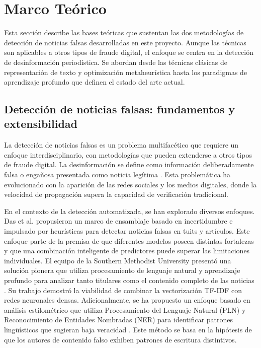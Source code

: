 \chapter{Marco Teórico \label{cap:MarcoTeorico}}

Esta sección describe las bases teóricas que sustentan las dos metodologías de detección de noticias falsas desarrolladas en este proyecto. Aunque las técnicas son aplicables a otros tipos de fraude digital, el enfoque se centra en la detección de desinformación periodística. Se abordan desde las técnicas clásicas de representación de texto y optimización metaheurística hasta los paradigmas de aprendizaje profundo que definen el estado del arte actual.

\section{Detección de noticias falsas: fundamentos y extensibilidad}
\label{sec:deteccion_noticias_falsas}

La detección de noticias falsas es un problema multifacético que requiere un enfoque interdisciplinario, con metodologías que pueden extenderse a otros tipos de fraude digital. La desinformación se define como información deliberadamente falsa o engañosa presentada como noticia legítima \cite{bondielli2019survey}. Esta problemática ha evolucionado con la aparición de las redes sociales y los medios digitales, donde la velocidad de propagación supera la capacidad de verificación tradicional.

En el contexto de la detección automatizada, se han explorado diversos enfoques. Das et al. \cite{das2022heuristic} propusieron un marco de ensamblaje basado en incertidumbre e impulsado por heurísticas para detectar noticias falsas en tuits y artículos. Este enfoque parte de la premisa de que diferentes modelos poseen distintas fortalezas y que una combinación inteligente de predictores puede superar las limitaciones individuales. El equipo de la Southern Methodist University presentó una solución pionera que utiliza procesamiento de lenguaje natural y aprendizaje profundo para analizar tanto titulares como el contenido completo de las noticias \cite{thota2018fake}. Su trabajo demostró la viabilidad de combinar la vectorización TF-IDF con redes neuronales densas. Adicionalmente, se ha propuesto un enfoque basado en análisis estilométrico que utiliza Procesamiento del Lenguaje Natural (PLN) y Reconocimiento de Entidades Nombradas (NER) para identificar patrones lingüísticos que sugieran baja veracidad \cite{tsai2023stylometric}. Este método se basa en la hipótesis de que los autores de contenido falso exhiben patrones de escritura distintivos.

